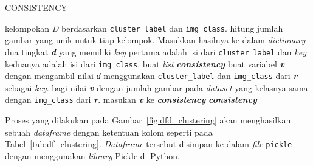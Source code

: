 \begin{algorithm}[H]
	\caption{CONSISTENCY}
	\label{alg:consistency}
	\begin{algorithmic}[1]
		\STATE kelompokan \textit{D} berdasarkan \texttt{cluster\_label} dan \texttt{img\_class}.
		\STATE hitung jumlah gambar yang unik untuk tiap kelompok. Masukkan hasilnya ke dalam \textit{dictionary} dua tingkat \textit{\textbf{d}} yang memiliki \textit{key} pertama adalah isi dari \texttt{cluster\_label} dan \textit{key} keduanya adalah isi dari \texttt{img\_class}.
		\STATE buat \textit{list} \textit{\textbf{consistency}}
		\STATE buat variabel \textit{\textbf{v}} dengan mengambil nilai \textit{\texttt{d}} menggunakan \texttt{cluster\_label} dan \texttt{img\_class} dari \textit{\textbf{r}} sebagai \textit{key}.
		\STATE bagi nilai \textit{\textbf{v}} dengan jumlah gambar pada \textit{dataset} yang kelasnya sama dengan \texttt{img\_class} dari \textit{\textbf{r}}.
		\STATE masukan \textit{\textbf{v}} ke \textit{\textbf{consistency}}
		\ENDFOR
		\RETURN \textit{\textbf{consistency}}
	\end{algorithmic}
\end{algorithm}
Proses yang dilakukan pada Gambar~\ref{fig:dfd_clustering} akan menghasilkan sebuah \textit{dataframe} dengan ketentuan kolom seperti pada Tabel~\ref{tab:df_clustering}. \textit{Dataframe} tersebut disimpan ke dalam \textit{file} \texttt{pickle} dengan menggunakan \textit{library} Pickle di Python.
